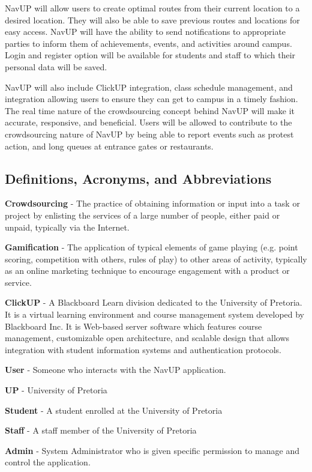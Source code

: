 \documentclass[12pt]{article}
\begin{document}
NavUP will allow users to create optimal routes from their current location to a desired location. They will also be able to save previous routes and locations for easy access. NavUP will have the ability to send notifications to appropriate parties to inform them of achievements, events, and activities around campus. Login and register option will be available for students and staff to which their personal data will be saved.

 NavUP will also include ClickUP integration, class schedule management, and integration allowing users to ensure they can get to campus in a timely fashion. 
The real time nature of the crowdsourcing concept behind NavUP will make it accurate, responsive, and beneficial.
Users will be allowed to contribute to the crowdsourcing nature of NavUP by being able to report events such as protest action, and long queues at entrance gates or restaurants.

	\subsection{Definitions, Acronyms, and Abbreviations}
		{\bfseries Crowdsourcing} - The practice of obtaining information or input into a task or project by enlisting the services of a large number of people, either paid or unpaid, typically via the Internet.
		
		{\bfseries Gamification} - The application of typical elements of game playing (e.g. point scoring, competition with others, rules of play) to other areas of activity, typically as an online marketing technique to encourage engagement with a product or service.

		{\bfseries ClickUP} - A Blackboard Learn division dedicated to the University of Pretoria. It is a virtual learning environment and course management system developed by Blackboard Inc. It is Web-based server software which features course management, customizable open architecture, and scalable design that allows integration with student information systems and authentication protocols.
		
		{\bfseries User} - Someone who interacts with the NavUP application.

		{\bfseries UP} - University of Pretoria
		
		{\bfseries Student} - A student enrolled at the University of Pretoria
		
		{\bfseries Staff} - A staff member of the University of Pretoria
		
		{\bfseries Admin} - System Administrator who is given specific permission to manage and control the application.
\end{document}
